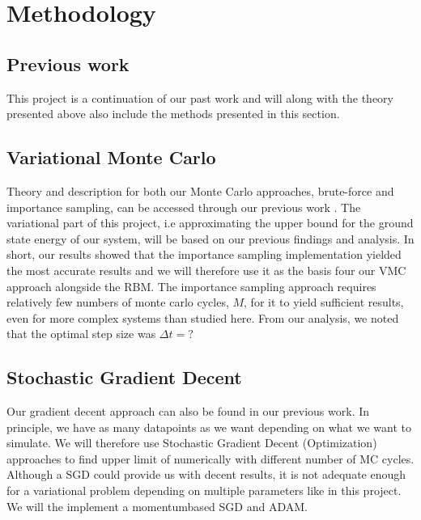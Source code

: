 \section{Methodology}\label{sec:Method}

\subsection{Previous work}\label{sec:project method}
This project is a continuation of our past work and will along with the theory presented above also include the methods presented in this section.

\subsection{Variational Monte Carlo}
Theory and description for both our Monte Carlo approaches, brute-force and importance sampling, can be accessed through our previous work \citep{project1}. The variational part of this project, i.e approximating the upper bound for the ground state energy of our system, will be based on our previous findings and analysis. In short, our results showed that the importance sampling implementation yielded the most accurate results and we will therefore use it as the basis four our VMC approach alongside the RBM. The importance sampling approach requires relatively few numbers of monte carlo cycles, $M$, for it to yield sufficient results, even for more complex systems than studied here. From our analysis, we noted that the optimal step size was $\Delta t = ?$

\subsection{Stochastic Gradient Decent}

Our gradient decent approach can also be found in our previous work. In principle, we have as many datapoints as we want depending on what we want to simulate. We will therefore use Stochastic Gradient Decent (Optimization) approaches to find upper limit of numerically with different number of MC cycles. Although a SGD could provide us with decent results, it is not adequate enough for a variational problem depending on multiple parameters like in this project. We will the implement a momentumbased SGD and ADAM. 

